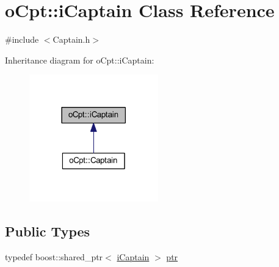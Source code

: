 \hypertarget{classo_cpt_1_1i_captain}{}\section{o\+Cpt\+:\+:i\+Captain Class Reference}
\label{classo_cpt_1_1i_captain}


{\ttfamily \#include $<$Captain.\+h$>$}



Inheritance diagram for o\+Cpt\+:\+:i\+Captain\+:
\nopagebreak
\begin{figure}[H]
\begin{center}
\leavevmode
\includegraphics[width=158pt]{classo_cpt_1_1i_captain__inherit__graph}
\end{center}
\end{figure}
\subsection*{Public Types}
\begin{DoxyCompactItemize}
\item 
typedef boost\+::shared\+\_\+ptr$<$ \hyperlink{classo_cpt_1_1i_captain}{i\+Captain} $>$ \hyperlink{classo_cpt_1_1i_captain_ae1595d808fa14777c26f1227a82ac4f5}{ptr}
\end{DoxyCompactItemize}

